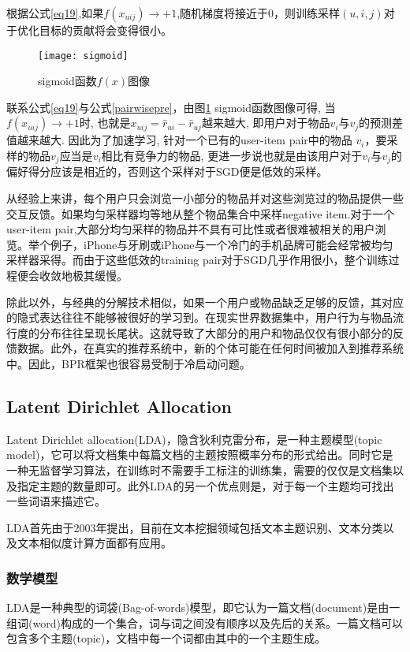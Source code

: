 根据公式\eqref{eq19},如果$f \left(x_{uij}\right) \rightarrow +1$,随机梯度将接近于0，则训练采样$\left(u,i,j\right)$对于优化目标的贡献将会变得很小。
\begin{figure}[htbp]
	\begin{center}
		\texttt{[image: sigmoid]}
		\caption{sigmoid函数$f \left(x\right) $图像}
		\label{gra-sigmoid}
	\end{center}
\end{figure}

联系公式\eqref{eq19}与公式\eqref{pairwisepre}，由图\ref{gra-sigmoid} sigmoid函数图像可得, 当$f \left(x_{uij}\right) \rightarrow +1$时, 也就是$x_{uij} = \hat{r}_{ui} - \hat{r}_{uj}$越来越大, 即用户对于物品$v_i$与$v_j$的预测差值越来越大. 因此为了加速学习, 针对一个已有的user-item pair中的物品 $v_i$，要采样的物品$v_j$应当是$v_i$相比有竞争力的物品, 更进一步说也就是由该用户对于$v_i$与$v_j$的偏好得分应该是相近的，否则这个采样对于SGD便是低效的采样。

从经验上来讲，每个用户只会浏览一小部分的物品并对这些浏览过的物品提供一些交互反馈。如果均匀采样器均等地从整个物品集合中采样negative  item.对于一个user-item  pair,大部分均匀采样的物品并不具有可比性或者很难被相关的用户浏览。举个例子，iPhone与牙刷或iPhone与一个冷门的手机品牌可能会经常被均匀采样器采得。而由于这些低效的training pair对于SGD几乎作用很小，整个训练过程便会收敛地极其缓慢。

除此以外，与经典的分解技术相似，如果一个用户或物品缺乏足够的反馈，其对应的隐式表达往往不能够被很好的学习到。在现实世界数据集中，用户行为与物品流行度的分布往往呈现长尾状。这就导致了大部分的用户和物品仅仅有很小部分的反馈数据。此外，在真实的推荐系统中，新的个体可能在任何时间被加入到推荐系统中。因此，BPR框架也很容易受制于冷启动问题。

\subsection{Latent Dirichlet Allocation}
Latent Dirichlet allocation(LDA)，隐含狄利克雷分布，是一种主题模型(topic model)，它可以将文档集中每篇文档的主题按照概率分布的形式给出。同时它是一种无监督学习算法，在训练时不需要手工标注的训练集，需要的仅仅是文档集以及指定主题的数量即可。此外LDA的另一个优点则是，对于每一个主题均可找出一些词语来描述它。

LDA首先由于2003年提出\cite{blei2003latent}，目前在文本挖掘领域包括文本主题识别、文本分类以及文本相似度计算方面都有应用。


\subsubsection{数学模型}
LDA是一种典型的词袋(Bag-of-words)模型，即它认为一篇文档(document)是由一组词(word)构成的一个集合，词与词之间没有顺序以及先后的关系。一篇文档可以包含多个主题(topic)，文档中每一个词都由其中的一个主题生成。

